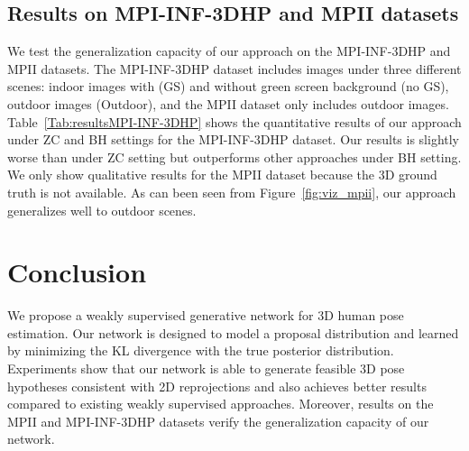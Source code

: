 \documentclass{bmvc2k}
\begin{document}
\vspace{5mm}
\subsection{Results on MPI-INF-3DHP and MPII datasets}
We test the generalization capacity of our approach on the MPI-INF-3DHP and MPII datasets. The MPI-INF-3DHP dataset includes images under three different scenes: indoor images with (GS) and without green screen background (no GS), outdoor images (Outdoor), and the MPII dataset only includes outdoor images. Table~\ref{Tab:resultsMPI-INF-3DHP} shows the quantitative results of our approach under ZC and BH settings for the MPI-INF-3DHP dataset. Our results is slightly worse than \cite{Wandt2019RepNet} under ZC setting but outperforms other approaches under BH setting.  We only show qualitative results for the MPII dataset because the 3D ground truth is not available. As can been seen from Figure~\ref{fig:viz_mpii}, our approach generalizes well to outdoor scenes.

\section{Conclusion}

We propose a weakly supervised generative network for 3D human pose estimation. Our network is designed to model a proposal distribution and learned by minimizing the KL divergence with the true posterior distribution. Experiments show that our network is able to generate feasible 3D pose hypotheses consistent with 2D reprojections and also achieves better results compared to existing weakly supervised approaches. Moreover, results on the MPII and MPI-INF-3DHP datasets verify the generalization capacity of our network.


\end{document}
